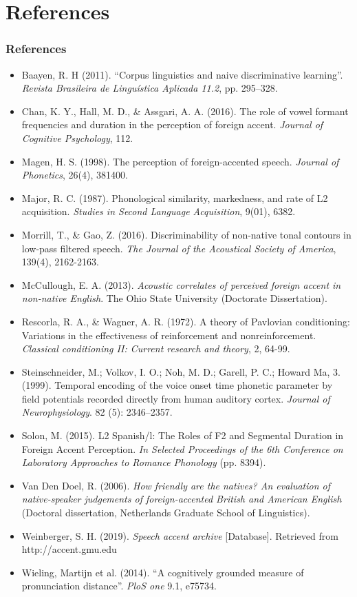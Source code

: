 \documentclass{beamer}
\begin{document}
\section{References}
\begin{frame}[shrink=20]
\frametitle{References}
\footnotesize{
\begin{itemize}
\item Baayen, R. H (2011). “Corpus linguistics and naive discriminative learning”. \emph{Revista Brasileira de Linguística Aplicada 11.2}, pp. 295–328.
\item Chan, K. Y., Hall, M. D., \& Assgari, A. A. (2016). The role of vowel formant frequencies and duration in the perception of foreign accent. \emph {Journal of Cognitive Psychology}, 1\textendash{}12.
\item Magen, H. S. (1998). The perception of foreign-accented speech. \emph{Journal of Phonetics}, 26(4), 381\textendash{}400.
\item Major, R. C. (1987). Phonological similarity, markedness, and rate of L2 acquisition. \emph{Studies in Second Language Acquisition}, 9(01), 63\textendash{}82.
\item Morrill, T., \& Gao, Z. (2016). Discriminability of non-native tonal contours in low-pass filtered speech. \emph{The Journal of the Acoustical Society of America}, 139(4), 2162-2163.
\item McCullough, E. A. (2013). \emph{Acoustic correlates of perceived foreign accent in non-native English}. The Ohio State University (Doctorate Dissertation). 
\item Rescorla, R. A., \& Wagner, A. R. (1972). A theory of Pavlovian conditioning: Variations in the effectiveness of reinforcement and nonreinforcement. \emph{Classical conditioning II: Current research and theory}, 2, 64-99.
\item Steinschneider, M.; Volkov, I. O.; Noh, M. D.; Garell, P. C.; Howard Ma, 3. (1999). Temporal encoding of the voice onset time phonetic parameter by field potentials recorded directly from human auditory cortex. \emph{Journal of Neurophysiology}. 82 (5): 2346–2357.
\item Solon, M. (2015). L2 Spanish/l: The Roles of F2 and Segmental Duration in Foreign Accent Perception. \emph{In Selected Proceedings of the 6th Conference on Laboratory Approaches to Romance Phonology} (pp. 83\textendash{}94). 
\item Van Den Doel, R. (2006). \emph{How friendly are the natives? An evaluation of native-speaker judgements of foreign-accented British and American English }(Doctoral dissertation, Netherlands Graduate School of Linguistics).
\item Weinberger, S. H. (2019). \emph{Speech accent archive }[Database]. Retrieved from http://accent.gmu.edu
\item Wieling, Martijn et al. (2014). “A cognitively grounded measure of pronunciation distance”. \emph{PloS one} 9.1, e75734.


\end{itemize}}
\end{frame}
\end{document}
